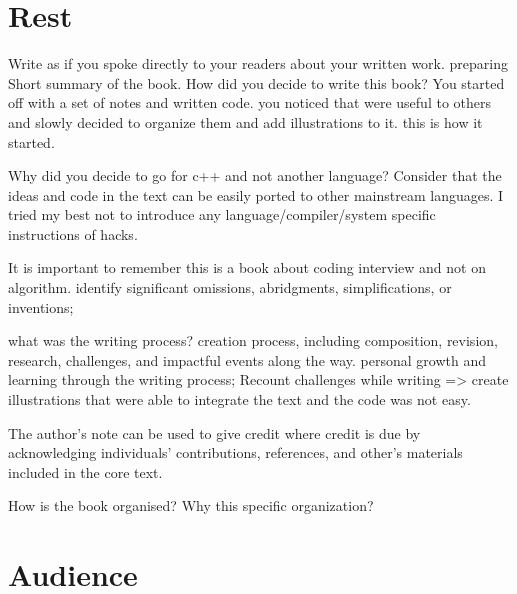 \section*{Rest}
Write as if you spoke directly to your readers about your written work.
preparing 
Short summary of the book. 
How did you decide to write this book? You started off with a set of notes and written code. you noticed that were useful to others and slowly decided to organize them and add illustrations to it. this is how it started. 

Why did you decide to go for c++ and not another language? Consider that the ideas and code in the text can be easily ported to other mainstream languages. I tried my best not to introduce any language/compiler/system specific instructions of hacks.

It is important to remember this is a book about coding interview and not on algorithm. 
identify significant omissions, abridgments, simplifications, or inventions; 


what was the writing process?
creation process, including composition, revision, research, challenges, and impactful events along the way. personal growth and learning through the writing process; 
Recount challenges while writing => create illustrations that were able to integrate the text and the code was not easy. 


The author’s note can be used to give credit where credit is due by acknowledging individuals’ contributions, references, and other’s materials included in the core text.

How is the book organised? Why this specific organization?


\section*{Audience}



